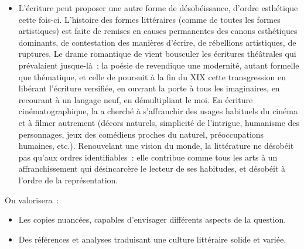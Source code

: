 {\begin{itemize}
qu'il s'agisse de celle de  ou de , peut prendre de forts accents
polémiques et satiriques, dénonçant avec virulence des réalités et poussant le
lecteur à l'insoumission. L'ouvrage d'inspiration autobiographique de ,
, invite le lecteur à rompre avec une morale étriquée
et à trouver une liberté d'être soi. Les écrits qui gardent mémoire de voix
réduites au silence sont, par leur simple existence, de l'ordre de la
désobéissance à l'ordre de la parole, ce que résume parfaitement le vers de
Marceline , s'aventurant au début du XIX\ieme{} siècle dans une
littérature réservée aux hommes~: .
\item L'écriture peut proposer une autre forme de désobéissance, d'ordre esthétique
cette fois-ci. L'histoire des formes littéraires (comme de toutes les formes
artistiques) est faite de remises en causes permanentes des canons
esthétiques dominants, de contestation des manières d'écrire, de rébellions
artistiques, de ruptures. Le drame romantique de  vient bousculer les
écritures théâtrales qui prévalaient jusque-là~; la poésie de 
revendique une modernité, autant formelle que thématique, et celle de  poursuit à la fin du XIX\ieme{} cette transgression en libérant l'écriture
versifiée, en ouvrant la porte à tous les imaginaires, en recourant à un langage
neuf, en démultipliant le moi. En écriture cinématographique, la  a cherché à s'affranchir des usages habituels du cinéma et à filmer
autrement (décors naturels, simplicité de l'intrigue, humanisme des
personnages, jeux des comédiens proches du naturel, préoccupations
humaines, etc.). Renouvelant une vision du monde, la littérature ne désobéit
pas qu'aux ordres identifiables~: elle contribue comme tous les arts à un
affranchissement qui désincarcère le lecteur de ses habitudes, et désobéit à
l'ordre de la représentation.
\end{itemize}

On valorisera~:
\begin{itemize}
\item Les copies nuancées, capables d'envisager différents aspects de la question.
\item Des références et analyses traduisant une culture littéraire solide et variée.
\end{itemize}}

